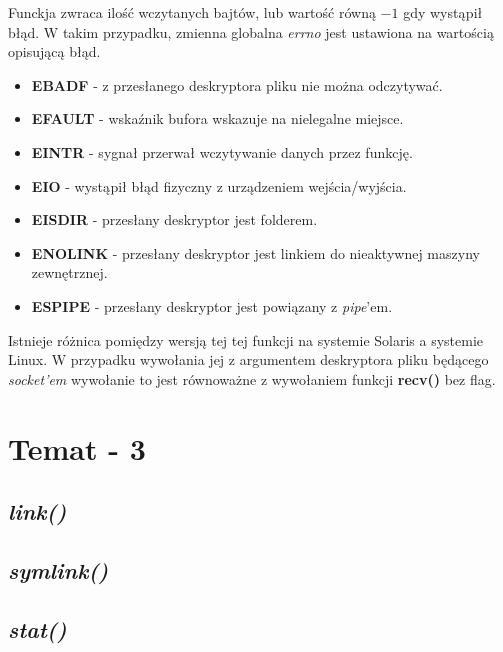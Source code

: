 \documentclass{article}
\begin{document}
Funckja zwraca ilość wczytanych bajtów, lub wartość równą $-1$ gdy wystąpił błąd.
W takim przypadku, zmienna globalna \textit{errno} jest ustawiona na wartością opisującą błąd.

\begin{itemize}
\item \textbf{EBADF} - z przesłanego deskryptora pliku nie można odczytywać.
\item \textbf{EFAULT} - wskaźnik bufora wskazuje na nielegalne miejsce.
\item \textbf{EINTR} - sygnał przerwał wczytywanie danych przez funkcję.
\item \textbf{EIO} - wystąpił błąd fizyczny z urządzeniem wejścia/wyjścia.
\item \textbf{EISDIR} - przesłany deskryptor jest folderem.
\item \textbf{ENOLINK} - przesłany deskryptor jest linkiem do nieaktywnej maszyny zewnętrznej.
\item \textbf{ESPIPE} - przesłany deskryptor jest powiązany z \textit{pipe}'em.
\end{itemize}

Istnieje różnica pomiędzy wersją tej tej funkcji na systemie Solaris a systemie Linux.
W przypadku wywołania jej z argumentem deskryptora pliku będącego \textit{socket'em} wywołanie to jest równoważne z wywołaniem funkcji \textbf{recv()} bez flag.

  
\section{Temat - 3}
\subsection{\textit{link()}}
\subsection{\textit{symlink()}}
\subsection{\textit{stat()}}
\end{document}
